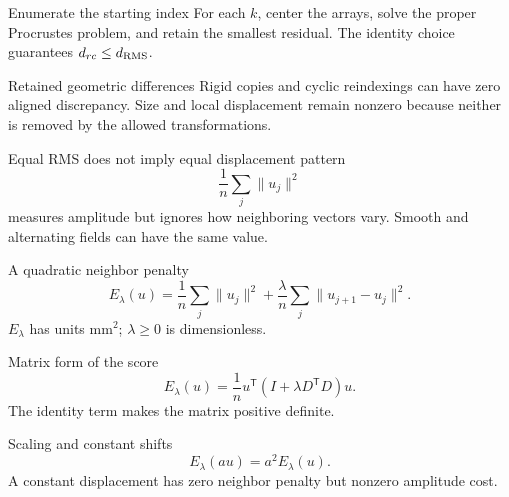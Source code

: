 \documentclass[aspectratio=169,11pt]{beamer}
\newcommand{\notestarget}{notes.pdf}\newcommand{\noteslabel}{Notes}
\begin{document}
\renewcommand{\notestarget}{notes.pdf\#note-cyclic-rigid-alignment}
\begin{frame}[t,fragile,label=slide-enumerate-the-starting-index]{Enumerate the starting index}
For each $k$, center the arrays, solve the proper Procrustes problem, and retain the smallest residual.\pause{} The identity choice guarantees $d_{rc}\le d_{\rm RMS}$.
\end{frame}
\renewcommand{\notestarget}{notes.pdf\#note-a-finite-cohort-and-its-comparison-rule}
\begin{frame}[t,fragile,label=slide-retained-geometric-differences]{Retained geometric differences}
Rigid copies and cyclic reindexings can have zero aligned discrepancy.\pause{} Size and local displacement remain nonzero because neither is removed by the allowed transformations.
\end{frame}
\renewcommand{\notestarget}{notes.pdf\#note-amplitude-and-neighbor-variation-penalties}
\begin{frame}[t,fragile,label=slide-equal-rms-does-not-imply-equal-displacement-pattern]{Equal RMS does not imply equal displacement pattern}
\[\frac1n\sum_j\|u_j\|^2\] measures amplitude but ignores how neighboring vectors vary.\pause{} Smooth and alternating fields can have the same value.
\end{frame}
\renewcommand{\notestarget}{notes.pdf\#note-amplitude-and-neighbor-variation-penalties}
\begin{frame}[t,fragile,label=slide-a-quadratic-neighbor-penalty]{A quadratic neighbor penalty}
\[E_\lambda(u)=\frac1n\sum_j\|u_j\|^2+\frac\lambda n\sum_j\|u_{j+1}-u_j\|^2.\]\pause{} $E_\lambda$ has units mm$^2$; $\lambda\ge0$ is dimensionless.
\end{frame}
\renewcommand{\notestarget}{notes.pdf\#note-amplitude-and-neighbor-variation-penalties}
\begin{frame}[t,fragile,label=slide-matrix-form-of-the-score]{Matrix form of the score}
\[E_\lambda(u)=\frac1n u^{\mathsf T}(I+\lambda D^{\mathsf T}D)u.\]\pause{} The identity term makes the matrix positive definite.
\end{frame}
\renewcommand{\notestarget}{notes.pdf\#note-fourier-interpretation-of-the-roughness-weight}
\begin{frame}[t,fragile,label=slide-scaling-and-constant-shifts]{Scaling and constant shifts}
\[E_\lambda(au)=a^2E_\lambda(u).\]\pause{} A constant displacement has zero neighbor penalty but nonzero amplitude cost.
\end{frame}
\renewcommand{\notestarget}{notes.pdf\#note-fourier-interpretation-of-the-roughness-weight}
\end{document}
